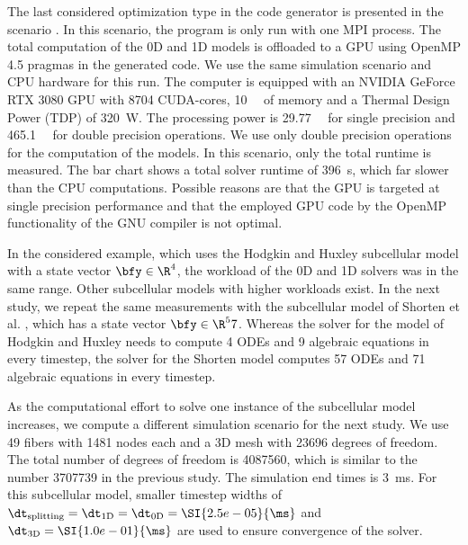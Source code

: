The last considered optimization type in the code generator is presented in the scenario . In this scenario, the program is only run with one MPI process. The total computation of the 0D and 1D models is offloaded to a GPU using OpenMP 4.5 pragmas in the generated code. We use the same simulation scenario and CPU hardware for this run. The computer is equipped with an NVIDIA GeForce RTX 3080 GPU with 8704 CUDA-cores, \SI{10}{\giga\byte} of memory and a Thermal Design Power (TDP) of \SI{320}{\watt}. The processing power is \SI{29.77}{\tera\flops} for single precision and \SI{465.1}{\giga\flops} for double precision operations. We use only double precision operations for the computation of the models.
In this scenario, only the total runtime is measured. The bar chart shows a total solver runtime of \SI{396}{\s}, which far slower than the CPU computations. Possible reasons are that the GPU is targeted at single precision performance and that the employed GPU code by the OpenMP functionality of the GNU compiler is not optimal.

In the considered example, which uses the Hodgkin and Huxley subcellular model with a state vector $\bfy \in \R^4$, the workload of the 0D and 1D solvers was in the same range. Other subcellular models with higher workloads exist. In the next study, we repeat the same measurements with the subcellular model of Shorten et al. \cite{shorten2007mathematical}, which has a state vector $\bfy \in \R^57$.  Whereas the solver for the model of Hodgkin and Huxley needs to compute 4 ODEs and 9 algebraic equations in every timestep, the solver for the Shorten model computes 57 ODEs and 71 algebraic equations in every timestep.

As the computational effort to solve one instance of the subcellular model increases, we compute a different simulation scenario for the next study. 
We use 49 fibers with 1481 nodes each and a 3D mesh with \num{23696} degrees of freedom. The total number of degrees of freedom is \num{4087560}, which is similar to the number \num{3707739} in the previous study. The simulation end times is \SI{3}{\ms}. For this subcellular model, smaller timestep widths of $\dt_\text{splitting}=\dt_\text{1D}=\dt_\text{0D}=\SI{2.5e-05}{\ms}$ and $\dt_\text{3D}=\SI{1.0e-01}{\ms}$ are used to ensure convergence of the solver.

